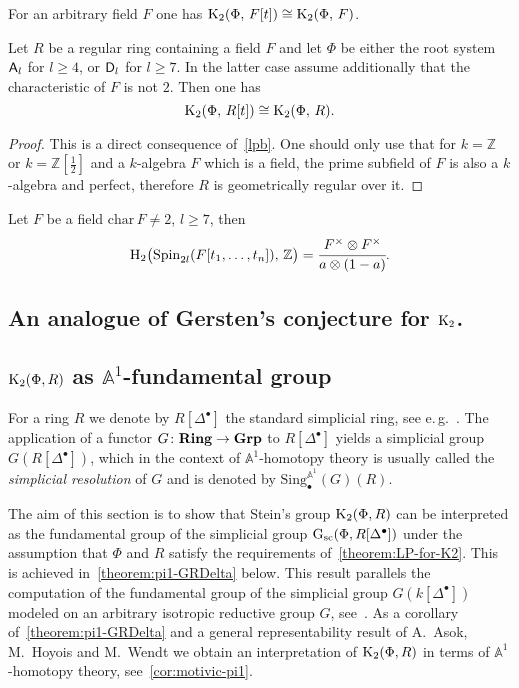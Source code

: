 \documentclass[oneside, 11pt]{amsart} \pdfoutput=1
\begin{document}
\begin{theorem}
For an arbitrary field $F$ one has ${\mathrm{K}}_2(\Phi,\,F[t])\cong{\mathrm{K}}_2(\Phi,\,F)$.
\end{theorem}

\begin{theorem} \label{theorem:LP-for-K2}
Let $R$ be a regular ring containing a field $F$ and let $\Phi$ be either the root system $\mathsf{A}_l$  for $l\geq4$, or $\mathsf{D}_l$ for $l\geq7$. In the latter case assume additionally that the characteristic of $F$ is not $2$. Then one has
\[{\mathrm{K}}_2(\Phi,\,R[t])\cong{\mathrm{K}}_2(\Phi,\,R).\]
\end{theorem}
\begin{proof}
This is a direct consequence of~\ref{lpb}. One should only use that for $k=\mathbb Z$ or $k=\mathbb Z[\frac12]$ and a $k$-algebra $F$ which is a field, the prime subfield of $F$ is also a $k$-algebra and perfect, therefore $R$ is geometrically regular over it.
\end{proof}

\begin{corollary}
Let $F$ be a field $\mathrm{char}\,F\neq2$, $l\geq7$, then
$$
\mathrm H_2\big(\mathrm{Spin}_{2l}(F[t_1,\ldots,t_n]),\,\mathbb Z\big)=\cfrac{F^\times\otimes F^\times}{a\otimes(1-a)}.
$$
\end{corollary}
\subsection{An analogue of Gersten's conjecture for ${\mathrm{K}}_2$.} \label{sec:K2-GC}

\subsection{\texorpdfstring{${\mathrm{K}}_2(\Phi, R)$}{K2(R)} as $\mathbb{A}^1$-fundamental group}
For a ring $R$ we denote by $R[\Delta^\bullet]$ the standard simplicial ring, see e.\,g.~\cite{Jar83}. The application of a functor $G\colon{\normalfont\textbf{Ring}}\rightarrow{\normalfont\textbf{Grp}}$ to $R[\Delta^\bullet]$ yields a simplicial group $G(R[\Delta^\bullet])$, which in the context of $\mathbb{A}^1$-homotopy theory is usually called the {\it simplicial resolution} of $G$ and is denoted by $\mathrm{Sing}^{\mathbb{A}^1}_\bullet(G)(R)$.

The aim of this section is to show that Stein's group ${\mathrm{K}}_2(\Phi, R)$ can be interpreted as the fundamental group of the simplicial group $\mathrm{G}_\mathrm{sc}(\Phi, R[\Delta^\bullet])$ under the assumption that $\Phi$ and $R$ satisfy the requirements of~\cref{theorem:LP-for-K2}. This is achieved in~\cref{theorem:pi1-GRDelta} below. This result parallels the computation of the fundamental group of the simplicial group $G(k[\Delta^\bullet])$ modeled on an arbitrary isotropic reductive group $G$, see~\cite[Proposition~3.2]{VW16}. As a corollary of~\cref{theorem:pi1-GRDelta} and a general representability result of A.~Asok, M.~Hoyois and M.~Wendt we obtain an interpretation of ${\mathrm{K}}_2(\Phi, R)$ in terms of $\mathbb{A}^1$-homotopy theory, see~\cref{cor:motivic-pi1}.
\end{document}
